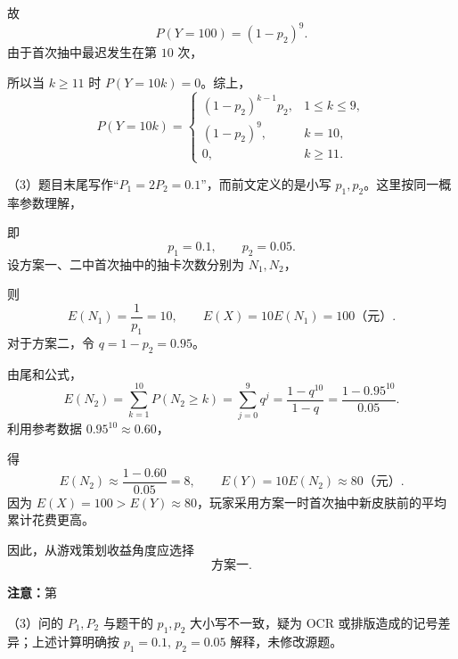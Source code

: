 \documentclass[UTF8,12pt,a4paper]{ctexart}
\begin{document}
故
\[
   P(Y=100)=(1-p_2)^9.
   \]
由于首次抽中最迟发生在第 \(10\) 次，

所以当 \(k\ge11\) 时 \(P(Y=10k)=0\)。综上，
\[
   \boxed{
   P(Y=10k)=
   \begin{cases}
   (1-p_2)^{k-1}p_2,&1\le k\le9,\\
   (1-p_2)^9,&k=10,\\
   0,&k\ge11.
   \end{cases}}
   \]


\par\smallskip\noindent（3）题目末尾写作``\(P_1=2P_2=0.1\)''，而前文定义的是小写 \(p_1,p_2\)。这里按同一概率参数理解，

即
\[
   p_1=0.1,\qquad p_2=0.05.
   \]
设方案一、二中首次抽中的抽卡次数分别为 \(N_1,N_2\)，

则
\[
   E(N_1)=\frac1{p_1}=10,
   \qquad
   E(X)=10E(N_1)=100\text{（元）}.
   \]
对于方案二，令 \(q=1-p_2=0.95\)。

由尾和公式，
\[
   E(N_2)
   =\sum_{k=1}^{10}P(N_2\ge k)
   =\sum_{j=0}^{9}q^j
   =\dfrac{1-q^{10}}{1-q}
   =\dfrac{1-0.95^{10}}{0.05}.
   \]
利用参考数据 \(0.95^{10}\approx0.60\)，

得
\[
   E(N_2)\approx\dfrac{1-0.60}{0.05}=8,
   \qquad
   E(Y)=10E(N_2)\approx80\text{（元）}.
   \]
因为 \(E(X)=100>E(Y)\approx80\)，玩家采用方案一时首次抽中新皮肤前的平均累计花费更高。

因此，从游戏策划收益角度应选择
\[
   \boxed{\text{方案一}}.
   \]

\textbf{注意：}第
\par\smallskip\noindent（3）问的 \(P_1,P_2\) 与题干的 \(p_1,p_2\) 大小写不一致，疑为 OCR 或排版造成的记号差异；上述计算明确按 \(p_1=0.1,\ p_2=0.05\) 解释，未修改源题。
\end{document}

